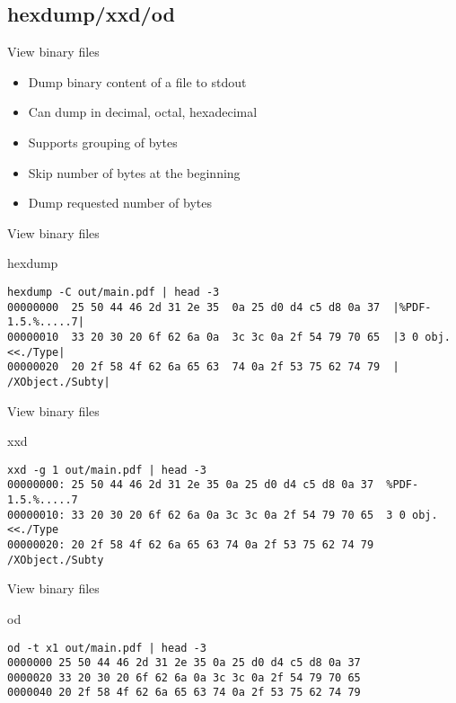 \subsection{hexdump/xxd/od}

\begin{frame}[fragile]{View binary files}
  \begin{itemize}
    \pause \item Dump binary content of a file to stdout
    \pause \item Can dump in decimal, octal, hexadecimal
    \pause \item Supports grouping of bytes
    \pause \item Skip number of bytes at the beginning
    \pause \item Dump requested number of bytes
  \end{itemize}
\end{frame}

\begin{frame}[fragile]{View binary files}
  \begin{exampleblock}{hexdump}
    \begin{lstlisting}[showstringspaces=false,basicstyle=\tiny]
hexdump -C out/main.pdf | head -3
00000000  25 50 44 46 2d 31 2e 35  0a 25 d0 d4 c5 d8 0a 37  |%PDF-1.5.%.....7|
00000010  33 20 30 20 6f 62 6a 0a  3c 3c 0a 2f 54 79 70 65  |3 0 obj.<<./Type|
00000020  20 2f 58 4f 62 6a 65 63  74 0a 2f 53 75 62 74 79  | /XObject./Subty|
    \end{lstlisting}
  \end{exampleblock}
\end{frame}

\begin{frame}[fragile]{View binary files}
  \begin{exampleblock}{xxd}
    \begin{lstlisting}[showstringspaces=false,basicstyle=\tiny]
xxd -g 1 out/main.pdf | head -3
00000000: 25 50 44 46 2d 31 2e 35 0a 25 d0 d4 c5 d8 0a 37  %PDF-1.5.%.....7
00000010: 33 20 30 20 6f 62 6a 0a 3c 3c 0a 2f 54 79 70 65  3 0 obj.<<./Type
00000020: 20 2f 58 4f 62 6a 65 63 74 0a 2f 53 75 62 74 79   /XObject./Subty
    \end{lstlisting}
  \end{exampleblock}
\end{frame}

\begin{frame}[fragile]{View binary files}
  \begin{exampleblock}{od}
    \begin{lstlisting}[showstringspaces=false,basicstyle=\tiny]
od -t x1 out/main.pdf | head -3
0000000 25 50 44 46 2d 31 2e 35 0a 25 d0 d4 c5 d8 0a 37
0000020 33 20 30 20 6f 62 6a 0a 3c 3c 0a 2f 54 79 70 65
0000040 20 2f 58 4f 62 6a 65 63 74 0a 2f 53 75 62 74 79
    \end{lstlisting}
  \end{exampleblock}
\end{frame}


